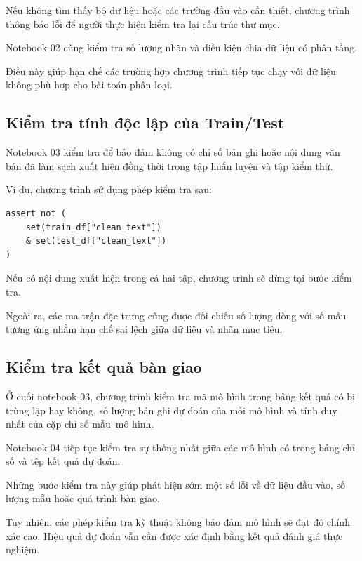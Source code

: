Nếu không tìm thấy bộ dữ liệu hoặc các trường đầu vào cần thiết, chương trình thông báo lỗi để người thực hiện kiểm tra lại cấu trúc thư mục.

Notebook 02 cũng kiểm tra số lượng nhãn và điều kiện chia dữ liệu có phân tầng.

Điều này giúp hạn chế các trường hợp chương trình tiếp tục chạy với dữ liệu không phù hợp cho bài toán phân loại.


\subsection{Kiểm tra tính độc lập của Train/Test}

Notebook 03 kiểm tra để bảo đảm không có chỉ số bản ghi hoặc nội dung văn bản đã làm sạch xuất hiện đồng thời trong tập huấn luyện và tập kiểm thử.

Ví dụ, chương trình sử dụng phép kiểm tra sau:

\begin{verbatim}
assert not (
    set(train_df["clean_text"])
    & set(test_df["clean_text"])
)
\end{verbatim}

Nếu có nội dung xuất hiện trong cả hai tập, chương trình sẽ dừng tại bước kiểm tra.

Ngoài ra, các ma trận đặc trưng cũng được đối chiếu số lượng dòng với số mẫu tương ứng nhằm hạn chế sai lệch giữa dữ liệu và nhãn mục tiêu.


\subsection{Kiểm tra kết quả bàn giao}

Ở cuối notebook 03, chương trình kiểm tra mã mô hình trong bảng kết quả có bị trùng lặp hay không, số lượng bản ghi dự đoán của mỗi mô hình và tính duy nhất của cặp chỉ số mẫu--mô hình.

Notebook 04 tiếp tục kiểm tra sự thống nhất giữa các mô hình có trong bảng chỉ số và tệp kết quả dự đoán.

Những bước kiểm tra này giúp phát hiện sớm một số lỗi về dữ liệu đầu vào, số lượng mẫu hoặc quá trình bàn giao.

Tuy nhiên, các phép kiểm tra kỹ thuật không bảo đảm mô hình sẽ đạt độ chính xác cao. Hiệu quả dự đoán vẫn cần được xác định bằng kết quả đánh giá thực nghiệm.



